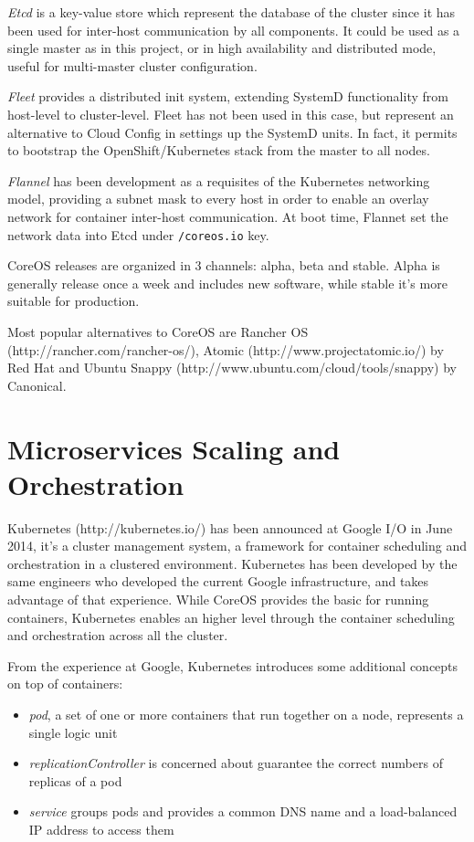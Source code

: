 \textit{Etcd} is a key-value store which represent the database of the cluster since it has been used for inter-host communication by all components.  It could be used as a single master as in this project, or in high availability and distributed mode, useful for multi-master cluster configuration.

\textit{Fleet} provides a distributed init system, extending SystemD functionality from host-level to cluster-level.  Fleet has not been used in this case, but represent an alternative to Cloud Config in settings up the SystemD units.  In fact, it permits to bootstrap the OpenShift/Kubernetes stack from the master to all nodes.

\textit{Flannel} has been development as a requisites of the Kubernetes networking model, providing a subnet mask to every host in order to enable an overlay network for container inter-host communication.  At boot time, Flannet set the network data into Etcd under \texttt{/coreos.io} key.

CoreOS releases are organized in 3 channels: alpha, beta and stable. Alpha is generally release once a week and includes new software, while stable it's more suitable for production.

Most popular alternatives to CoreOS are Rancher OS (http://rancher.com/rancher-os/), Atomic (http://www.projectatomic.io/) by Red Hat and Ubuntu Snappy (http://www.ubuntu.com/cloud/tools/snappy) by Canonical.

\section{Microservices Scaling and Orchestration}\label{microservices-scaling-and-orchestration}

Kubernetes (http://kubernetes.io/) has been announced at Google I/O in June 2014, it's a cluster management system, a framework for container scheduling and orchestration in a clustered environment. Kubernetes has been developed by the same engineers who developed the current Google infrastructure, and takes advantage of that experience.  While CoreOS provides the basic for running containers, Kubernetes enables an higher level through the container scheduling and orchestration across all the cluster.

From the experience at Google, Kubernetes introduces some additional concepts on top of containers:
\begin{itemize}
\item \textit{pod}, a set of one or more containers that run together on a node, represents a single logic unit
\item \textit{replicationController} is concerned about guarantee the correct numbers of replicas of a pod
\item \textit{service} groups pods and provides a common DNS name and a load-balanced IP address to access them
\end{itemize}

